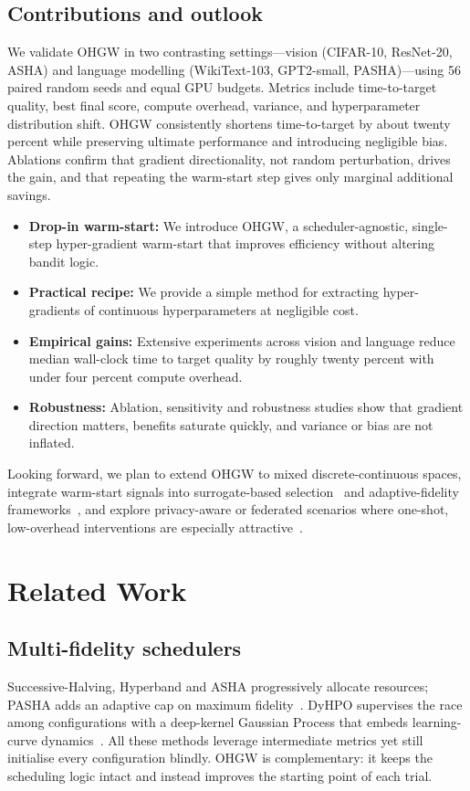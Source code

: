 \documentclass{article} %
\begin{document}
\subsection{Contributions and outlook}
We validate OHGW in two contrasting settings---vision (CIFAR-10, ResNet-20, ASHA) and language modelling (WikiText-103, GPT2-small, PASHA)---using 56 paired random seeds and equal GPU budgets. Metrics include time-to-target quality, best final score, compute overhead, variance, and hyperparameter distribution shift. OHGW consistently shortens time-to-target by about twenty percent while preserving ultimate performance and introducing negligible bias. Ablations confirm that gradient directionality, not random perturbation, drives the gain, and that repeating the warm-start step gives only marginal additional savings.

\begin{itemize}
  \item \textbf{Drop-in warm-start:} We introduce OHGW, a scheduler-agnostic, single-step hyper-gradient warm-start that improves efficiency without altering bandit logic.
  \item \textbf{Practical recipe:} We provide a simple method for extracting hyper-gradients of continuous hyperparameters at negligible cost.
  \item \textbf{Empirical gains:} Extensive experiments across vision and language reduce median wall-clock time to target quality by roughly twenty percent with under four percent compute overhead.
  \item \textbf{Robustness:} Ablation, sensitivity and robustness studies show that gradient direction matters, benefits saturate quickly, and variance or bias are not inflated.
\end{itemize}

Looking forward, we plan to extend OHGW to mixed discrete-continuous spaces, integrate warm-start signals into surrogate-based selection~\cite{khazi-2023-deep} and adaptive-fidelity frameworks~\cite{jiang-2024-efficient}, and explore privacy-aware or federated scenarios where one-shot, low-overhead interventions are especially attractive~\cite{panda-2022-new,khodak-2021-federated}.

\section{Related Work}\label{sec:related}
\subsection{Multi-fidelity schedulers}
Successive-Halving, Hyperband and ASHA progressively allocate resources; PASHA adds an adaptive cap on maximum fidelity~\cite{bohdal-2022-pasha}. DyHPO supervises the race among configurations with a deep-kernel Gaussian Process that embeds learning-curve dynamics~\cite{wistuba-2022-supervising}. All these methods leverage intermediate metrics yet still initialise every configuration blindly. OHGW is complementary: it keeps the scheduling logic intact and instead improves the starting point of each trial.
\end{document}

